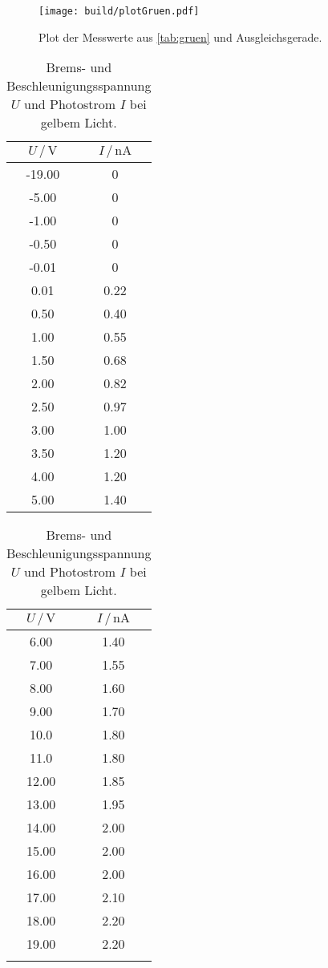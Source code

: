 \begin{figure}[H]
  \centering
  \texttt{[image: build/plotGruen.pdf]}
  \caption{Plot der Messwerte aus \autoref{tab:gruen} und Ausgleichsgerade.}
  \label{fig:plot_gruen}
\end{figure}

\begin{table}[H]
  \centering
  \caption{Brems- und Beschleunigungsspannung $U$ und Photostrom $I$ bei gelbem Licht.}
  \begin{tabular}{|c|c|}
    \toprule
    $U \,/\, \si{\volt}$ & $I \,/\, \si{\nano\ampere}$\\
    \midrule
    -19.00 & 0\\
    -5.00 & 0\\
    -1.00 & 0\\
    -0.50 & 0\\
    -0.01 & 0\\
    0.01 & 0.22\\
    0.50 & 0.40\\
    1.00 & 0.55\\
    1.50 & 0.68\\
    2.00 & 0.82\\
    2.50 & 0.97\\
    3.00 & 1.00\\
    3.50 & 1.20\\
    4.00 & 1.20\\
    5.00 & 1.40\\
    \bottomrule
  \end{tabular}
  \begin{tabular}{|c|c|}
    \toprule
    $U \,/\, \si{\volt}$ & $I \,/\, \si{\nano\ampere}$\\
    \midrule
    6.00 & 1.40\\
    7.00 & 1.55\\
    8.00 & 1.60\\
    9.00 & 1.70\\
    10.0 & 1.80\\
    11.0 & 1.80\\
    12.00 & 1.85\\
    13.00 & 1.95\\
    14.00 & 2.00\\
    15.00 & 2.00\\
    16.00 & 2.00\\
    17.00 & 2.10\\
    18.00 & 2.20\\
    19.00 & 2.20\\
    \text{---} & \text{---}\\
    \bottomrule 
  \end{tabular}
  \label{tab:gelb}
\end{table}

